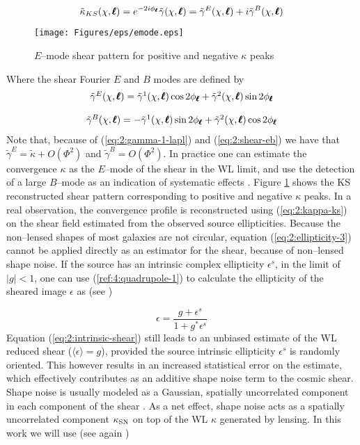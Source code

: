 \begin{equation}
\label{eq:2:kappa-ks}
\tilde{\kappa}_{KS}(\chi,\pmb{\ell}) = e^{-2i\phi_{\pmb{\ell}}} \tilde{\gamma}(\chi,\pmb{\ell}) = \tilde{\gamma}^E(\chi,\pmb{\ell}) + i\tilde{\gamma}^B(\chi,\pmb{\ell})
\end{equation}
%
\begin{figure}
\begin{center}
\texttt{[image: Figures/eps/emode.eps]}
\end{center}
\caption{$E$--mode shear pattern for positive and negative $\kappa$ peaks}
\label{fig:2:emode}
\end{figure}
%
Where the shear Fourier $E$ and $B$ modes are defined by
\begin{equation}
\label{eq:2:shear-eb}
\begin{matrix}
\tilde{\gamma}^E(\chi,\pmb{\ell}) =  \tilde{\gamma}^1(\chi,\pmb{\ell})\cos 2\phi_{\pmb{\ell}} +  \tilde{\gamma}^2(\chi,\pmb{\ell}) \sin 2\phi_{\pmb{\ell}}\\ \\ 
\tilde{\gamma}^B(\chi,\pmb{\ell}) = - \tilde{\gamma}^1(\chi,\pmb{\ell})\sin 2\phi_{\pmb{\ell}} + \tilde{\gamma}^2(\chi,\pmb{\ell}) \cos 2\phi_{\pmb{\ell}}
\end{matrix}
\end{equation}
%
Note that, because of (\ref{eq:2:gamma-1-lapl}) and (\ref{eq:2:shear-eb}) we have that $\tilde{\gamma}^E=\tilde{\kappa}+O(\Phi^2)$ and $\tilde{\gamma}^B=O(\Phi^2)$. In practice one can estimate the convergence $\kappa$ as the $E$--mode of the shear in the WL limit, and use the detection of a large $B$--mode as an indication of systematic effects \citep{PetriSpShear}. Figure \ref{fig:2:emode} shows the KS reconstructed shear pattern corresponding to positive and negative $\kappa$ peaks. In a real observation, the convergence profile is reconstructed using (\ref{eq:2:kappa-ks}) on the shear field estimated from the observed source ellipticities. Because the non--lensed shapes of most galaxies are not circular, equation (\ref{eq:2:ellipticity-3}) cannot be applied directly as an estimator for the shear, because of non--lensed shape noise. If the source has an intrinsic complex ellipticity $\epsilon^s$, in the limit of $\vert g\vert<1$, one can use (\ref{ref:4:quadrupole-1}) to calculate the ellipticity of the sheared image $\epsilon$ as (see \citep{RayTracingHartlap})

\begin{equation}
\label{eq:2:intrinsic-shear}
\epsilon = \frac{g+\epsilon^s}{1+g^*\epsilon^s}
\end{equation}
%
Equation (\ref{eq:2:intrinsic-shear}) still leads to an unbiased estimate of the WL reduced shear ($\langle\epsilon\rangle=g$), provided the source intrinsic ellipticity $\epsilon^s$ is randomly oriented. This however results in an increased statistical error on the estimate, which effectively contributes as an additive shape noise term to the cosmic shear. Shape noise is usually modeled as a Gaussian, spatially uncorrelated component in each component of the shear \citep{SongKnox}. As a net effect, shape noise acts as a spatially uncorrelated component $\kappa_{\rm SN}$ on top of the WL $\kappa$ generated by lensing. In this work we will use (see again \citep{SongKnox})


